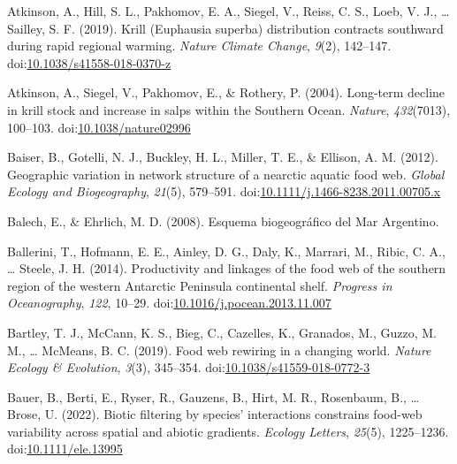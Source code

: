 \documentclass[
]{article}
\newlength{\cslhangindent}
\newlength{\cslentryspacingunit} %
\newenvironment{CSLReferences}[2] %
 {%
  \setlength{\parindent}{0pt}
  \ifodd #1
  \let\oldpar\par
  \def\par{\hangindent=\cslhangindent\oldpar}
  \fi
  \setlength{\parskip}{#2\cslentryspacingunit}
 }%
 {}
\begin{document}
\begin{CSLReferences}{1}{0}
\leavevmode{}%
Atkinson, A., Hill, S. L., Pakhomov, E. A., Siegel, V., Reiss, C. S.,
Loeb, V. J., \ldots{} Sailley, S. F. (2019). Krill ({Euphausia} superba)
distribution contracts southward during rapid regional warming.
\emph{Nature Climate Change}, \emph{9}(2), 142--147.
doi:\href{https://doi.org/10.1038/s41558-018-0370-z}{10.1038/s41558-018-0370-z}

\leavevmode{}%
Atkinson, A., Siegel, V., Pakhomov, E., \& Rothery, P. (2004). Long-term
decline in krill stock and increase in salps within the {Southern
Ocean}. \emph{Nature}, \emph{432}(7013), 100--103.
doi:\href{https://doi.org/10.1038/nature02996}{10.1038/nature02996}

\leavevmode{}%
Baiser, B., Gotelli, N. J., Buckley, H. L., Miller, T. E., \& Ellison,
A. M. (2012). Geographic variation in network structure of a nearctic
aquatic food web. \emph{Global Ecology and Biogeography}, \emph{21}(5),
579--591.
doi:\href{https://doi.org/10.1111/j.1466-8238.2011.00705.x}{10.1111/j.1466-8238.2011.00705.x}

\leavevmode{}%
Balech, E., \& Ehrlich, M. D. (2008). {Esquema biogeográfico del Mar
Argentino}.

\leavevmode{}%
Ballerini, T., Hofmann, E. E., Ainley, D. G., Daly, K., Marrari, M.,
Ribic, C. A., \ldots{} Steele, J. H. (2014). Productivity and linkages
of the food web of the southern region of the western {Antarctic
Peninsula} continental shelf. \emph{Progress in Oceanography},
\emph{122}, 10--29.
doi:\href{https://doi.org/10.1016/j.pocean.2013.11.007}{10.1016/j.pocean.2013.11.007}

\leavevmode{}%
Bartley, T. J., McCann, K. S., Bieg, C., Cazelles, K., Granados, M.,
Guzzo, M. M., \ldots{} McMeans, B. C. (2019). Food web rewiring in a
changing world. \emph{Nature Ecology \& Evolution}, \emph{3}(3),
345--354.
doi:\href{https://doi.org/10.1038/s41559-018-0772-3}{10.1038/s41559-018-0772-3}

\leavevmode{}%
Bauer, B., Berti, E., Ryser, R., Gauzens, B., Hirt, M. R., Rosenbaum,
B., \ldots{} Brose, U. (2022). Biotic filtering by species' interactions
constrains food-web variability across spatial and abiotic gradients.
\emph{Ecology Letters}, \emph{25}(5), 1225--1236.
doi:\href{https://doi.org/10.1111/ele.13995}{10.1111/ele.13995}


\end{CSLReferences}
\end{document}
